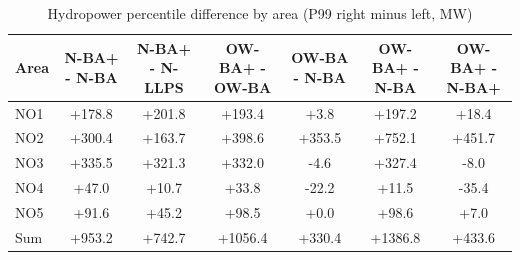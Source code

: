 \begin{table}[htbp]
\centering
\caption{Hydropower percentile difference by area (P99 right minus left, MW)}
\label{tab:hydro_p99_diff_area_pairs}
\begin{tabular}{lcccccc}
\hline
Area & N-BA+ - N-BA & N-BA+ - N-LLPS & OW-BA+ - OW-BA & OW-BA - N-BA & OW-BA+ - N-BA & OW-BA+ - N-BA+ \\
\hline
NO1 & +178.8 & +201.8 & +193.4 & +3.8 & +197.2 & +18.4 \\
NO2 & +300.4 & +163.7 & +398.6 & +353.5 & +752.1 & +451.7 \\
NO3 & +335.5 & +321.3 & +332.0 & -4.6 & +327.4 & -8.0 \\
NO4 & +47.0 & +10.7 & +33.8 & -22.2 & +11.5 & -35.4 \\
NO5 & +91.6 & +45.2 & +98.5 & +0.0 & +98.6 & +7.0 \\
\hline
Sum & +953.2 & +742.7 & +1056.4 & +330.4 & +1386.8 & +433.6 \\
\hline
\end{tabular}
\end{table}